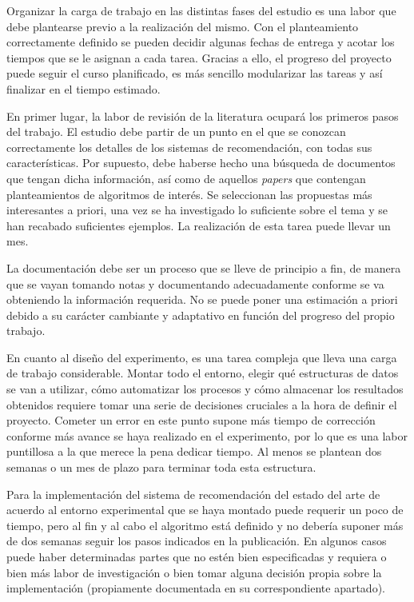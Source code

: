 Organizar la carga de trabajo en las distintas fases del estudio es una labor que debe plantearse previo a la realización del mismo. Con el planteamiento correctamente definido se pueden decidir algunas fechas de entrega y acotar los tiempos que se le asignan a cada tarea. Gracias a ello, el progreso del proyecto puede seguir el curso planificado, es más sencillo modularizar las tareas y así finalizar en el tiempo estimado.

En primer lugar, la labor de revisión de la literatura ocupará los primeros pasos del trabajo. El estudio debe partir de un punto en el que se conozcan correctamente los detalles de los sistemas de recomendación, con todas sus características. Por supuesto, debe haberse hecho una búsqueda de documentos que tengan dicha información, así como de aquellos \textit{papers} que contengan planteamientos de algoritmos de interés. Se seleccionan las propuestas más interesantes a priori, una vez se ha investigado lo suficiente sobre el tema y se han recabado suficientes ejemplos. La realización de esta tarea puede llevar un mes.

La documentación debe ser un proceso que se lleve de principio a fin, de manera que se vayan tomando notas y documentando adecuadamente conforme se va obteniendo la información requerida. No se puede poner una estimación a priori debido a su carácter cambiante y adaptativo en función del progreso del propio trabajo.

En cuanto al diseño del experimento, es una tarea compleja que lleva una carga de trabajo considerable. Montar todo el entorno, elegir qué estructuras de datos se van a utilizar, cómo automatizar los procesos y cómo almacenar los resultados obtenidos requiere tomar una serie de decisiones cruciales a la hora de definir el proyecto. Cometer un error en este punto supone más tiempo de corrección conforme más avance se haya realizado en el experimento, por lo que es una labor puntillosa a la que merece la pena dedicar tiempo. Al menos se plantean dos semanas o un mes de plazo para terminar toda esta estructura.

Para la implementación del sistema de recomendación del estado del arte de acuerdo al entorno experimental que se haya montado puede requerir un poco de tiempo, pero al fin y al cabo el algoritmo está definido y no debería suponer más de dos semanas seguir los pasos indicados en la publicación. En algunos casos puede haber determinadas partes que no estén bien especificadas y requiera o bien más labor de investigación o bien tomar alguna decisión propia sobre la implementación (propiamente documentada en su correspondiente apartado).

